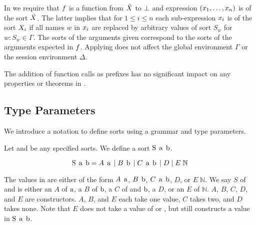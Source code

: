 In \RSideEffect we require that $f$ is a function from $\tilde{X}$ to $\bot$ and expression $\left(x_1,\ldots,x_n\right)$ is of the sort $\tilde{X}$.
The latter implies that for $1 \leq i \leq n$ each sub-expression $x_i$ is of the sort $X_i$ if all names $w$ in $x_i$ are replaced by arbitrary values of sort $S_w$ for $w:S_w \in \Gamma$.
The sorts of the arguments given correspond to the sorts of the arguments expected in $f$.
Applying \RSideEffect does not affect the global environment $\Gamma$ or the session environment $\Delta$.

The addition of function calls as prefixes has no significant impact on any properties or theorems in \cite{PetersEtal21}.

\subsection{Type Parameters}
We introduce a notation to define sorts using a grammar and type parameters.

Let \TypeParamA and \TypeParamB be any specified sorts.
We define a sort $\operatorname{S}\;\operatorname{a}\;\operatorname{b}$.

\[\operatorname{S}\;\operatorname{a}\;\operatorname{b} = A\;\operatorname{a} \; | \; B\;\operatorname{b} \; | \; C\;\operatorname{a}\;\operatorname{b} \; | \; D \; | \; E\;\mathbb{N}\]

The values in \Sab are either of the form $A\;\operatorname{a}$, $B\;\operatorname{b}$, $C\;\operatorname{a}\;\operatorname{b}$, $D$, or $E\;\mathbb{N}$.
We say $S$ of \TypeParamA and \TypeParamB is either an $A$ of $\operatorname{a}$, a $B$ of $\operatorname{b}$, a $C$ of \TypeParamA and $\operatorname{b}$, a $D$, or an $E$ of $\mathbb{N}$.
$A$, $B$, $C$, $D$, and $E$ are constructors.
$A$, $B$, and $E$ each take one value, $C$ takes two, and $D$ takes none.
Note that $E$ does not take a value of \TypeParamA or \TypeParamB, but still constructs a value in $\operatorname{S}\;\operatorname{a}\;\operatorname{b}$.
